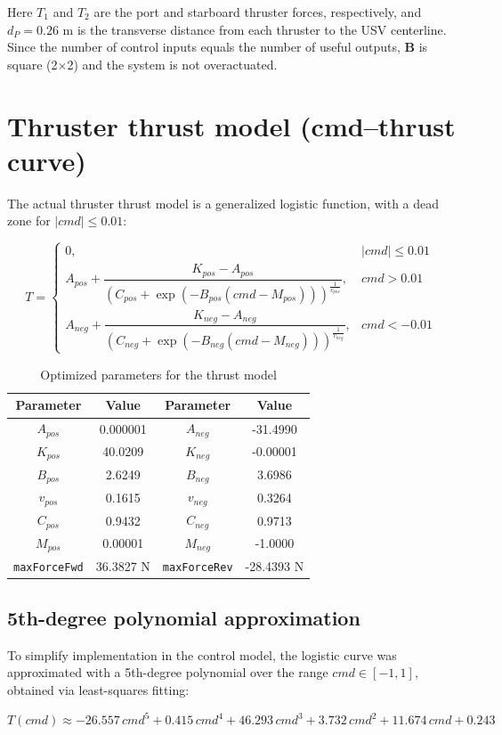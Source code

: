 \documentclass[11pt]{article}
\begin{document}
Here $T_1$ and $T_2$ are the port and starboard thruster forces, respectively, and $d_P = 0.26$ m is the transverse distance from each thruster to the USV centerline. Since the number of control inputs equals the number of useful outputs, $\mathbf{B}$ is square (2$\times$2) and the system is not overactuated.

\section*{Thruster thrust model (cmd--thrust curve)}

The actual thruster thrust model is a generalized logistic function, with a dead zone for $|cmd|\leq 0.01$:

\begin{equation}
T =
\begin{cases}
0, & |cmd| \leq 0.01 \\[8pt]
A_{pos} + \dfrac{K_{pos} - A_{pos}}{\left(C_{pos} + \exp\left(-B_{pos} (cmd - M_{pos})\right)\right)^{\frac{1}{v_{pos}}}}, & cmd > 0.01 \\[12pt]
A_{neg} + \dfrac{K_{neg} - A_{neg}}{\left(C_{neg} + \exp\left(-B_{neg} (cmd - M_{neg})\right)\right)^{\frac{1}{v_{neg}}}}, & cmd < -0.01
\end{cases}
\label{equa:cmd2thrust}
\end{equation}

\begin{table}[h]
\centering
\caption{Optimized parameters for the thrust model}
\label{tab:t200}
\begin{tabular}{|c|c||c|c|}
\hline
\textbf{Parameter} & \textbf{Value} & \textbf{Parameter} & \textbf{Value} \\
\hline
$A_{pos}$ & 0.000001 & $A_{neg}$ & -31.4990 \\
$K_{pos}$ & 40.0209  & $K_{neg}$ & -0.00001 \\
$B_{pos}$ & 2.6249   & $B_{neg}$ & 3.6986 \\
$v_{pos}$ & 0.1615   & $v_{neg}$ & 0.3264 \\
$C_{pos}$ & 0.9432   & $C_{neg}$ & 0.9713 \\
$M_{pos}$ & 0.00001  & $M_{neg}$ & -1.0000 \\
\texttt{maxForceFwd} & 36.3827 N & \texttt{maxForceRev} & -28.4393 N \\
\hline
\end{tabular}
\end{table}

\subsection*{5th-degree polynomial approximation}

To simplify implementation in the control model, the logistic curve was approximated with a 5th-degree polynomial over the range $cmd \in [-1,1]$, obtained via least-squares fitting:

\begin{equation}
T(cmd) \approx -26.557\,cmd^5 + 0.415\,cmd^4 + 46.293\,cmd^3 + 3.732\,cmd^2 + 11.674\,cmd + 0.243
\end{equation}
\end{document}
